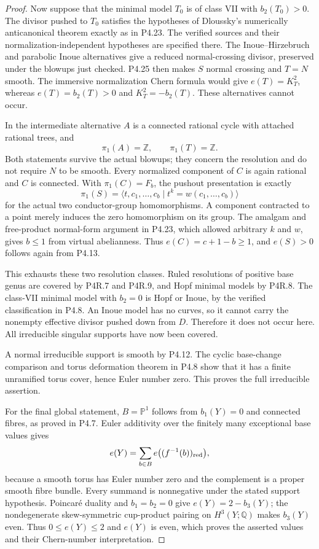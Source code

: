 \begin{proof}
Now suppose that the minimal model
$T_0$ is of class VII with
$b_2(T_0)>0$. The divisor pushed to
$T_0$ satisfies the hypotheses of
Dloussky's numerically anticanonical
theorem exactly as in P4.23.
The verified sources and their
normalization-independent hypotheses
are specified there. The
Inoue--Hirzebruch and parabolic Inoue
alternatives give a reduced
normal-crossing divisor, preserved
under the blowups just checked.
P4.25 then makes $S$ normal crossing
and $T=N$ smooth. The immersive
normalization Chern formula would
give $e(T)=K_T^2$, whereas
$e(T)=b_2(T)>0$ and
$K_T^2=-b_2(T)$. These alternatives
cannot occur.

In the intermediate alternative
$A$ is a connected rational cycle
with attached rational trees, and
\[
 \pi_1(A)=\mathbb Z,\qquad
 \pi_1(T)=\mathbb Z.
\]
Both statements survive the actual
blowups; they concern the resolution
and do not require $N$ to be smooth.
Every normalized component of $C$
is again rational and $C$ is connected.
With $\pi_1(C)=F_b$, the pushout
presentation is exactly
\[
 \pi_1(S)=
 \langle t,c_1,\ldots,c_b
 \mid t^k=w(c_1,\ldots,c_b)\rangle
\]
for the actual two conductor-group
homomorphisms. A component contracted
to a point merely induces the zero
homomorphism on its group. The
amalgam and free-product normal-form
argument in P4.23, which allowed
arbitrary $k$ and $w$, gives $b\le1$
from virtual abelianness.
Thus $e(C)=c+1-b\ge1$, and
$e(S)>0$ follows again from P4.13.

This exhausts these two resolution
classes. Ruled resolutions of positive
base genus are covered by P4R.7
and P4R.9, and Hopf minimal models
by P4R.8. The class-VII minimal
model with $b_2=0$ is Hopf or Inoue,
by the verified classification in
P4.8. An Inoue model has no curves,
so it cannot carry the nonempty
effective divisor pushed down from
$D$. Therefore it does not occur
here. All irreducible singular
supports have now been covered.

A normal irreducible support is
smooth by P4.12. The cyclic
base-change comparison and torus
deformation theorem in P4.8 show
that it has a finite unramified
torus cover, hence Euler number
zero. This proves the full
irreducible assertion.

For the final global statement,
$B=\mathbb P^1$ follows from
$b_1(Y)=0$ and connected fibres,
as proved in P4.7. Euler
additivity over the finitely many
exceptional base values gives
\[
 e(Y)=\sum_{b\in B}
 e\bigl((f^{-1}(b))_{\rm red}\bigr),
\]
because a smooth torus has Euler
number zero and the complement
is a proper smooth fibre bundle.
Every summand is nonnegative
under the stated support
hypothesis. Poincar\'e duality
and $b_1=b_2=0$ give
$e(Y)=2-b_3(Y)$; the nondegenerate
skew-symmetric cup-product
pairing on $H^3(Y;\mathbb Q)$
makes $b_3(Y)$ even. Thus
$0\le e(Y)\le2$ and $e(Y)$ is
even, which proves the asserted
values and their Chern-number
interpretation.
\end{proof}
